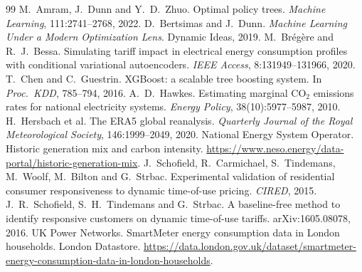 \documentclass[11pt]{article}
\begin{document}
\begin{thebibliography}{99}\small
{} M.~Amram, J.~Dunn and Y.~D.~Zhuo. Optimal policy trees. \emph{Machine Learning}, 111:2741--2768, 2022.
 D.~Bertsimas and J.~Dunn. \emph{Machine Learning Under a Modern Optimization Lens}. Dynamic Ideas, 2019.
 M.~Br\'eg\`ere and R.~J.~Bessa. Simulating tariff impact in electrical energy consumption profiles
with conditional variational autoencoders. \emph{IEEE Access}, 8:131949--131966, 2020.
 T.~Chen and C.~Guestrin. XGBoost: a scalable tree boosting system. In \emph{Proc.\ KDD}, 785--794, 2016.
 A.~D.~Hawkes. Estimating marginal CO$_2$ emissions rates for national electricity systems.
\emph{Energy Policy}, 38(10):5977--5987, 2010.
 H.~Hersbach et al. The ERA5 global reanalysis. \emph{Quarterly Journal of the Royal Meteorological
Society}, 146:1999--2049, 2020.
 National Energy System Operator. Historic generation mix and carbon intensity.
\url{https://www.neso.energy/data-portal/historic-generation-mix}.
 J.~Schofield, R.~Carmichael, S.~Tindemans, M.~Woolf, M.~Bilton and G.~Strbac. Experimental
validation of residential consumer responsiveness to dynamic time-of-use pricing. \emph{CIRED}, 2015.
 J.~R.~Schofield, S.~H.~Tindemans and G.~Strbac. A baseline-free method to identify responsive
customers on dynamic time-of-use tariffs. arXiv:1605.08078, 2016.
 UK Power Networks. SmartMeter energy consumption data in London households. London Datastore.
\url{https://data.london.gov.uk/dataset/smartmeter-energy-consumption-data-in-london-households}.
\end{thebibliography}
\end{document}
